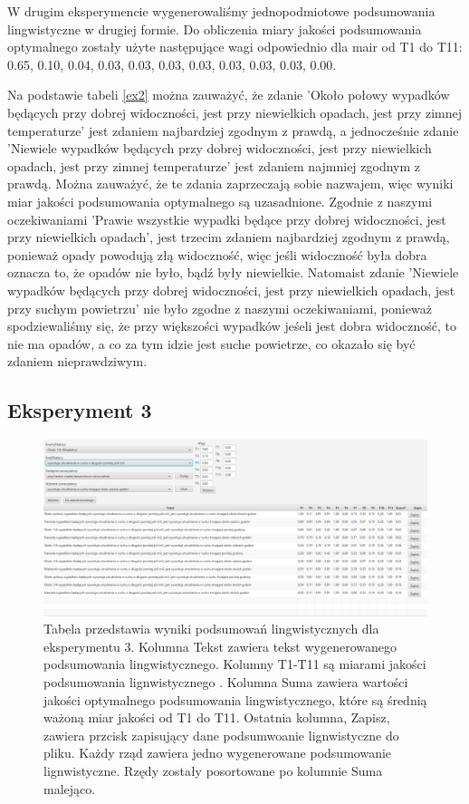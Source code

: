 \documentclass{classrep}
\begin{document}
W drugim eksperymencie wygenerowaliśmy jednopodmiotowe podsumowania lingwistyczne w drugiej formie. Do obliczenia miary jakości podsumowania optymalnego zostały użyte następujące wagi odpowiednio dla mair od T1 do T11: 0.65, 0.10, 0.04, 0.03, 0.03, 0.03, 0.03, 0.03, 0.03, 0.03, 0.00. 

Na podstawie tabeli \ref{ex2} można zauważyć, że zdanie 'Około połowy wypadków będących przy  dobrej widoczności, jest przy niewielkich opadach, jest przy zimnej temperaturze' jest zdaniem najbardziej zgodnym z prawdą, a jednocześnie zdanie 'Niewiele wypadków będących przy  dobrej widoczności, jest przy niewielkich opadach, jest przy zimnej temperaturze' jest zdaniem najmniej zgodnym z prawdą. Można zauważyć, że te zdania zaprzeczają sobie nazwajem, więc wyniki miar jakości podsumowania optymalnego są uzasadnione. Zgodnie z naszymi oczekiwaniami 'Prawie wszystkie wypadki będące przy dobrej widoczności, jest przy niewielkich opadach', jest trzecim zdaniem najbardziej zgodnym z prawdą, ponieważ opady powodują złą widoczność, więc jeśli widoczność była dobra oznacza to, że opadów nie było, bądź były niewielkie. Natomaist zdanie 'Niewiele wypadków będących przy dobrej widoczności, jest przy niewielkich opadach, jest przy suchym powietrzu' nie było zgodne z naszymi oczekiwaniami, ponieważ spodziewaliśmy się, że przy większości wypadków jeśeli jest dobra widoczność, to nie ma opadów, a co za tym idzie jest suche powietrze, co okazało się być zdaniem nieprawdziwym. 

\newpage
\subsection{Eksperyment 3}
\label{section:ex3}
\begin{figure}[h!]
 \centering
 \includegraphics[width=15cm]{ex3.png}
 \vspace{-0.3cm}
 \caption{Tabela przedstawia wyniki podsumowań lingwistycznych dla eksperymentu 3. Kolumna Tekst zawiera tekst wygenerowanego podsumowania lingwistycznego. Kolumny T1-T11 są miarami jakości podsumowania lignwistycznego \cite{niewiadomski19}. Kolumna Suma zawiera wartości jakości optymalnego podsumowania lingwistycznego, które są średnią ważoną miar jakości od T1 do T11. Ostatnia kolumna, Zapisz, zawiera przcisk zapisujący dane podsumwoanie lignwistyczne do pliku. Każdy rząd zawiera jedno wygenerowane podsumowanie lignwistyczne. Rzędy zostały posortowane po kolumnie Suma malejąco.  }
 \label{ex3}
\end{figure}
\end{document}
